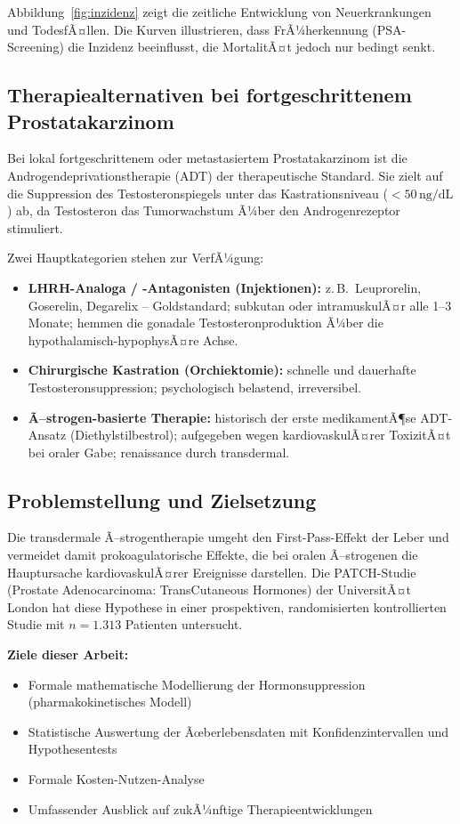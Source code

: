 ﻿\documentclass[a4paper,12pt]{article}
\theoremstyle{definition}
\begin{document}
Abbildung~\ref{fig:inzidenz} zeigt die zeitliche Entwicklung von Neuerkrankungen und TodesfÃ¤llen.
Die Kurven illustrieren, dass FrÃ¼herkennung (PSA-Screening) die Inzidenz beeinflusst, die MortalitÃ¤t jedoch nur bedingt senkt.

\subsection{Therapiealternativen bei fortgeschrittenem Prostatakarzinom}

Bei lokal fortgeschrittenem oder metastasiertem Prostatakarzinom ist die Androgendeprivationstherapie (ADT) der therapeutische Standard.
Sie zielt auf die Suppression des Testosteronspiegels unter das Kastrationsniveau ($< 50\,\text{ng/dL}$) ab, da Testosteron das Tumorwachstum Ã¼ber den Androgenrezeptor stimuliert.

Zwei Hauptkategorien stehen zur VerfÃ¼gung:
\begin{itemize}
  \item \textbf{LHRH-Analoga / -Antagonisten (Injektionen):} z.\,B.\ Leuprorelin, Goserelin, Degarelix -- Goldstandard; subkutan oder intramuskulÃ¤r alle 1--3 Monate; hemmen die gonadale Testosteronproduktion Ã¼ber die hypothalamisch-hypophysÃ¤re Achse.
  \item \textbf{Chirurgische Kastration (Orchiektomie):} schnelle und dauerhafte Testosteronsuppression; psychologisch belastend, irreversibel.
  \item \textbf{Ã–strogen-basierte Therapie:} historisch der erste medikamentÃ¶se ADT-Ansatz (Diethylstilbestrol); aufgegeben wegen kardiovaskulÃ¤rer ToxizitÃ¤t bei oraler Gabe; renaissance durch transdermal.
\end{itemize}

\subsection{Problemstellung und Zielsetzung}

Die transdermale Ã–strogentherapie umgeht den First-Pass-Effekt der Leber und vermeidet damit prokoagulatorische Effekte, die bei oralen Ã–strogenen die Hauptursache kardiovaskulÃ¤rer Ereignisse darstellen.
Die PATCH-Studie (Prostate Adenocarcinoma: TransCutaneous Hormones) der UniversitÃ¤t London hat diese Hypothese in einer prospektiven, randomisierten kontrollierten Studie mit $n = 1.313$ Patienten untersucht.

\textbf{Ziele dieser Arbeit:}
\begin{itemize}
  \item Formale mathematische Modellierung der Hormonsuppression (pharmakokinetisches Modell)
  \item Statistische Auswertung der Ãœberlebensdaten mit Konfidenzintervallen und Hypothesentests
  \item Formale Kosten-Nutzen-Analyse
  \item Umfassender Ausblick auf zukÃ¼nftige Therapieentwicklungen
\end{itemize}
\end{document}
